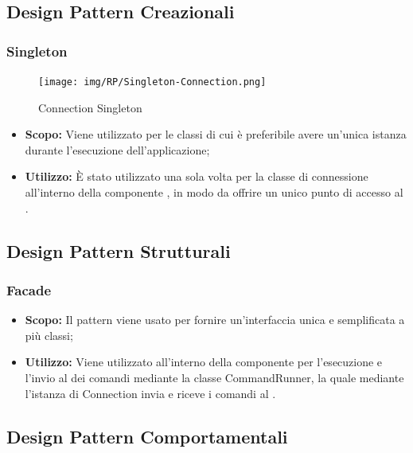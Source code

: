 \documentclass{scalatekids-article}
\begin{document}
\subsection{Design Pattern Creazionali}

\subsubsection{Singleton}

\begin{figure}[H]
  \begin{center}
    \texttt{[image: img/RP/Singleton-Connection.png]}
    \caption{Connection Singleton}
  \end{center}
\end{figure}

\begin{itemize}
\item \textbf{Scopo:} Viene utilizzato per le classi di cui è preferibile avere un'unica istanza
  durante l'esecuzione dell'applicazione;
\item \textbf{Utilizzo:} È stato utilizzato una sola volta per la classe di connessione all'interno
  della componente , in modo da offrire un unico punto di accesso al .
\end{itemize}

\subsection{Design Pattern Strutturali}

\subsubsection{Facade}

\begin{itemize}
\item \textbf{Scopo:} Il pattern  viene usato per fornire
  un'interfaccia unica e semplificata a più classi;
\item \textbf{Utilizzo:} Viene utilizzato all'interno della componente
   per l'esecuzione e l'invio al  dei comandi mediante
  la classe CommandRunner, la quale mediante l'istanza  di
  Connection invia e riceve i comandi al .
\end{itemize}

\subsection{Design Pattern Comportamentali}
\end{document}
